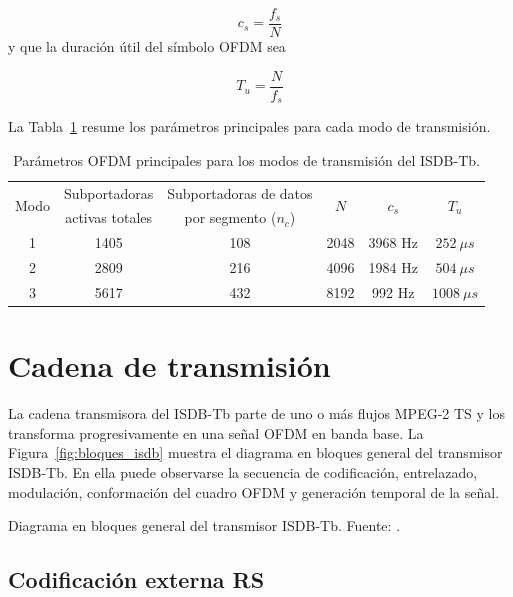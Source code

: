 \begin{equation}
c_s = \frac{f_s}{N}
\end{equation}
y que la duración útil del símbolo OFDM sea

\begin{equation}
T_u = \frac{N}{f_s}
\end{equation}

La Tabla~\ref{tab:isdbtb_modos} resume los parámetros principales para cada modo de transmisión.

{
\begin{table}[H]
\centering
\caption{Parámetros OFDM principales para los modos de transmisión del ISDB-Tb.}
\label{tab:isdbtb_modos}
\renewcommand{\arraystretch}{1.2}
\begin{tabular}{|c|c|c|c|c|c|}
\hline
\multirow{2}{*}{Modo} & Subportadoras & Subportadoras de datos & \multirow{2}{*}{$N$} & \multirow{2}{*}{$c_s$} & \multirow{2}{*}{$T_u$} \\
& activas totales & por segmento ($n_c$) & & & \\
\hline
1 & 1405 & 108 & 2048 & 3968 Hz & $252\ \mu s$ \\\hline
2 & 2809 & 216 & 4096 & 1984 Hz & $504\ \mu s$ \\\hline
3 & 5617 & 432 & 8192 & 992 Hz & $1008\ \mu s$ \\
\hline
\end{tabular}
\end{table}

}
\section{Cadena de transmisión}


La cadena transmisora del ISDB-Tb parte de uno o más flujos MPEG-2 TS y los transforma progresivamente en una señal OFDM en banda base. La Figura~\ref{fig:bloques_isdb} muestra el diagrama en bloques general del transmisor ISDB-Tb. En ella puede observarse la secuencia de codificación, entrelazado, modulación, conformación del cuadro OFDM y generación temporal de la señal.

{Diagrama en bloques general del transmisor ISDB-Tb.}
{Fuente: \cite{abnt}.}
{\label{fig:bloques_isdb}}

\subsection{Codificación externa RS}

